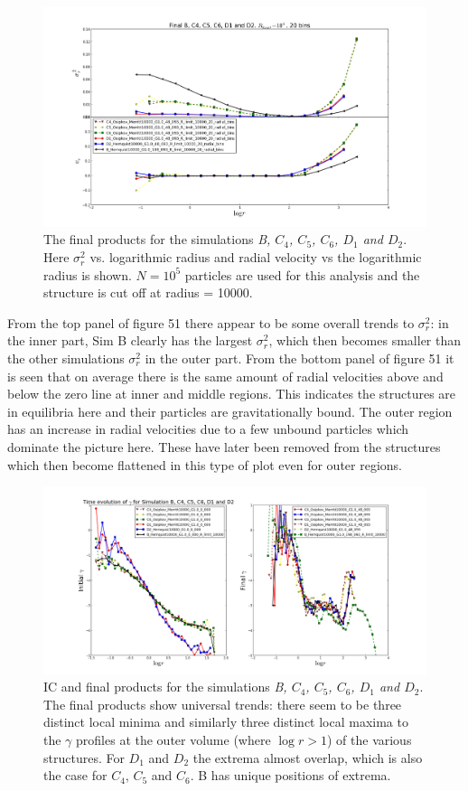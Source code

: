 \begin{figure}
\centering
\includegraphics[width=1.0\linewidth]{img/BC4C5C6D1D2_sigmar2_vr_logr_panel.png}
\caption{The final products for the simulations \emph{B, $C_4$, $C_5$, $C_6$, $D_1$ and $D_2$}. Here $\sigma_r^2$ vs. logarithmic radius and radial velocity vs the logarithmic radius is shown. $N = 10^5$ particles are used for this analysis and the structure is cut off at radius = 10000.}
\label{fig:test}
\end{figure}

From the top panel of figure 51 there appear to be some overall trends to $\sigma_r^2$:
in the inner part, Sim B clearly has the largest $\sigma_r^2$, which then becomes smaller than the other simulations $\sigma_r^2$ in the outer part. 
From the bottom panel of figure 51 it is seen that on average there is the same amount of radial velocities above and below the zero line at inner and middle regions. This indicates the structures are in equilibria here and their particles are gravitationally bound. The outer region has an increase in radial velocities due to a few unbound particles which dominate the picture here. These have later been removed from the structures which then become flattened in this type of plot even for outer regions.

\begin{figure}
\centering
\includegraphics[width=1.0\linewidth]{img/BC4C5C6D1D2_gamma.png}
\caption{IC and final products for the simulations \emph{B, $C_4$, $C_5$, $C_6$, $D_1$ and $D_2$}.
The final products show universal trends: there seem to be three distinct local minima and similarly three distinct local maxima to the $\gamma$ profiles at the outer volume (where $\log r > 1 $) of the various structures. For $D_1$ and $D_2$ the extrema almost overlap, which is also the case for $C_4$, $C_5$ and $C_6$. B has unique positions of extrema.}
\label{fig:test}
\end{figure}

